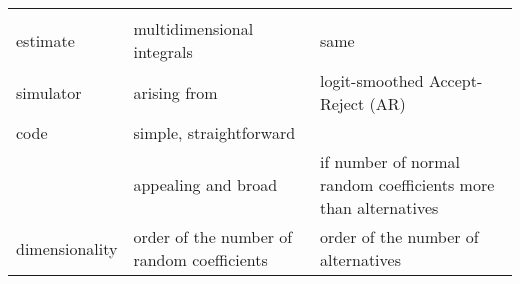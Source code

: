 \documentclass[
]{article}
\begin{document}
\begin{longtable}[]{@{}lll@{}}
\begin{minipage}[t]{0.39\columnwidth}
\strut
\end{minipage}\tabularnewline
\begin{minipage}[t]{0.13\columnwidth}\raggedright
estimate\strut
\end{minipage} & \begin{minipage}[t]{0.39\columnwidth}\raggedright
multidimensional integrals\strut
\end{minipage} & \begin{minipage}[t]{0.39\columnwidth}\raggedright
same\strut
\end{minipage}\tabularnewline
\begin{minipage}[t]{0.13\columnwidth}\raggedright
simulator\strut
\end{minipage} & \begin{minipage}[t]{0.39\columnwidth}\raggedright
arising from\strut
\end{minipage} & \begin{minipage}[t]{0.39\columnwidth}\raggedright
logit-smoothed Accept-Reject (AR)\strut
\end{minipage}\tabularnewline
\begin{minipage}[t]{0.13\columnwidth}\raggedright
code\strut
\end{minipage} & \begin{minipage}[t]{0.39\columnwidth}\raggedright
simple, straightforward\strut
\end{minipage} & \begin{minipage}[t]{0.39\columnwidth}\raggedright
\strut
\end{minipage}\tabularnewline
\begin{minipage}[t]{0.13\columnwidth}\raggedright
\strut
\end{minipage} & \begin{minipage}[t]{0.39\columnwidth}\raggedright
appealing and broad\strut
\end{minipage} & \begin{minipage}[t]{0.39\columnwidth}\raggedright
if number of normal random coefficients more than alternatives\strut
\end{minipage}\tabularnewline
\begin{minipage}[t]{0.13\columnwidth}\raggedright
dimensionality\strut
\end{minipage} & \begin{minipage}[t]{0.39\columnwidth}\raggedright
order of the number of random coefficients\strut
\end{minipage} & \begin{minipage}[t]{0.39\columnwidth}\raggedright
order of the number of alternatives\strut
\end{minipage}\tabularnewline
\bottomrule
\end{longtable}
\end{document}
